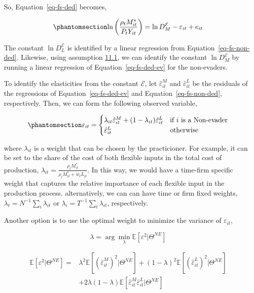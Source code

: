 \documentclass[
  12pt]{article}
\theoremstyle{definition}
\theoremstyle{remark}
\begin{document}
So, Equation~\ref{eq-fs-ded} becomes,

\begin{equation}\phantomsection\label{eq-fs-ded-ev}{
 \ln\left(\frac{\rho_t M^*_{it}}{P_t Y_{it}}\right)=\ln D^{\mathcal{E}}_M -\varepsilon_{it}+e_{it}
}\end{equation}

The constant \(\ln D^{\mathcal{E}}_L\) is identified by a linear
regression from Equation~\ref{eq-fs-non-ded}. Likewise, using assumption
\hyperref[ass-non-ev]{11.1}, we can identify the constant
\(\ln D^{\mathcal{E}}_M\) by running a linear regression of
Equation~\ref{eq-fs-ded-ev} for the non-evaders.

To identify the elasticities from the constant \(\mathcal{E}\), let
\(\hat\varepsilon^M_{it}\) and \(\hat\varepsilon^L_{it}\) be the
residuals of the regressions of Equation~\ref{eq-fs-ded-ev} and
Equation~\ref{eq-fs-non-ded}, respectively. Then, we can form the
following observed variable,

\begin{equation}\phantomsection\label{eq-wgt-eps}{
\varepsilon_{it}= \begin{cases}
\lambda_{it} \hat \varepsilon^M_{it} + (1-\lambda_{it}) \hat \varepsilon^L_{it} & \text{if $i$ is a Non-evader}\\
\hat \varepsilon^L_{it} & \text{otherwise}
\end{cases}
}\end{equation}

where \(\lambda_{it}\) is a weight that can be chosen by the
practicioner. For example, it can be set to the share of the cost of
both flexible inputs in the total cost of production,
\(\lambda_{it}=\frac{\rho_t M^*_{it}}{\rho_t M^*_{it}+w_t L_{it}}\). In
this way, we would have a time-firm specific weight that captures the
relative importance of each flexible input in the production process.
alternatively, we can can have time or firm fixed weights,
\(\lambda_t=N^{-1}\sum_i\lambda_{it}\) or
\(\lambda_i=T^{-1}\sum_t\lambda_{it}\), respectively.

Another option is to use the optimal weight to minimize the variance of
\(\varepsilon_{it}\),

\[
\lambda = \arg\min_{\lambda} \mathbb{E}\left[\varepsilon^2|\Theta^{NE}\right]
\]

\[
\begin{aligned}
\mathbb{E}\left[\varepsilon^2|\Theta^{NE}\right] =&\lambda^2 \mathbb{E}\left[\left(\hat \varepsilon^M_{it}\right)^2|\Theta^{NE}\right] + (1-\lambda)^2 \mathbb{E}\left[\left(\hat \varepsilon^L_{it}\right)^2|\Theta^{NE}\right]\\
&+ 2\lambda(1-\lambda)\mathbb{E}\left[\hat \varepsilon^M_{it}\hat \varepsilon^L_{it}|\Theta^{NE}\right]
\end{aligned}
\]
\end{document}
